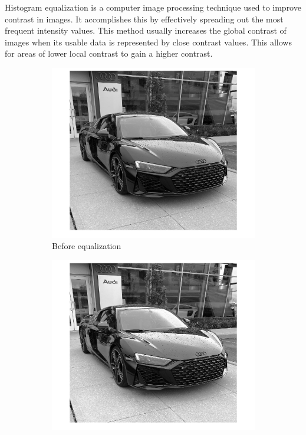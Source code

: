 \documentclass[conference]{IEEEtran}
\begin{document}
Histogram equalization is a computer image processing technique used to improve contrast in images. It accomplishes this by effectively spreading out the most frequent intensity values. This method usually increases the global contrast of images when its usable data is represented by close contrast values. This allows for areas of lower local contrast to gain a higher contrast.

\begin{figure}[h!]
\centering
\begin{subfigure}[b]{0.4\linewidth}
\includegraphics[width=\linewidth]{images/img1.jpg}
\caption{Before equalization}
\end{subfigure}
\begin{subfigure}[b]{0.4\linewidth}
\includegraphics[width=\linewidth]{images/img14.jpg}

\end{subfigure}
\end{figure}
\end{document}
